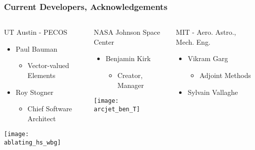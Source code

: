 \documentclass[mathserif]{beamer}
\begin{document}
\begin{frame}
\frametitle{Current Developers, Acknowledgements}

\begin{columns}


\begin{block}{UT Austin - PECOS}
\begin{itemize}
\item Paul Bauman
\begin{itemize}
\item Vector-valued Elements
\end{itemize}
\item Roy Stogner
\begin{itemize}
\item Chief Software Architect
\end{itemize}
\end{itemize}
\texttt{[image: ablating\_hs\_wbg]}
\end{block}

\begin{block}{NASA Johnson Space Center}
\begin{itemize}
\item Benjamin Kirk
\begin{itemize}
\item Creator, Manager
\end{itemize}
\end{itemize}
\texttt{[image: arcjet\_ben\_T]}
\end{block}

\begin{block}{MIT - Aero. Astro., Mech. Eng.}
\begin{itemize}
\item Vikram Garg
\begin{itemize}
\item Adjoint Methods
\end{itemize}
\item Sylvain Vallaghe
\end{itemize}
\end{block}

\end{columns}

\end{frame}
\end{document}
